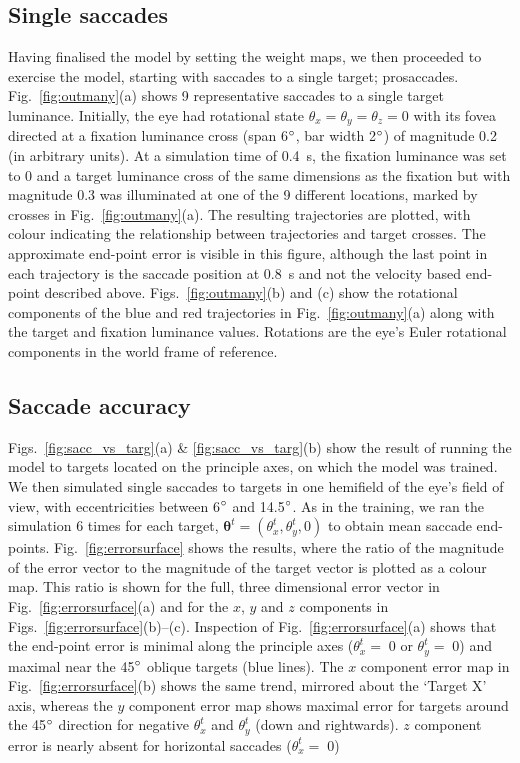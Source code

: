 \documentclass{frontiersSCNS}
\begin{document}
\subsection{Single saccades} \label{sec:singlesaccades}

Having finalised the model by setting the weight maps, we then proceeded 
to exercise the model, starting with saccades to a single target; 
prosaccades. Fig.~\ref{fig:outmany}(a) shows 9 representative saccades
to a single 
target luminance. Initially, the eye had rotational state
$\theta_x=\theta_y=\theta_z=0$ with its fovea directed at a 
fixation luminance cross (span 6$\degree$, bar width 2$\degree$) of 
magnitude 0.2 (in arbitrary units). At a 
simulation time of 0.4~s, the fixation luminance was set to 0 and 
a target luminance cross of the same dimensions as the fixation but with 
magnitude 0.3 was illuminated at one of the 
9 different locations, marked by crosses in Fig.~\ref{fig:outmany}(a).
The resulting trajectories are plotted, with colour indicating the 
relationship between trajectories and target crosses. The approximate 
end-point error is visible in this figure, although the last point in 
each trajectory is the saccade position at 0.8~s and not the velocity
based end-point described above. Figs.~\ref{fig:outmany}(b) and (c)
show the rotational components of the blue and red trajectories
in Fig.~\ref{fig:outmany}(a) along with the target and fixation 
luminance values. Rotations are the eye's Euler rotational components
in the world frame of reference.

\subsection{Saccade accuracy}

Figs.~\ref{fig:sacc_vs_targ}(a) \& \ref{fig:sacc_vs_targ}(b) show
the result of running the model to targets located on the principle
axes, on which the model was trained. We then simulated single saccades
to targets in one hemifield of the eye's field of view, with
eccentricities between 6$\degree$ and 14.5$\degree$. As in the
training, we ran the simulation 6 times for each target, 
$\mathbf{\theta}^t = (\theta_{x}^t, \theta_{y}^t, 0)$ to obtain
mean saccade end-points.
Fig.~\ref{fig:errorsurface} shows the results, where the ratio of 
the magnitude of the error vector to the magnitude of the target 
vector is plotted as a colour map. This ratio is shown for the full,
three dimensional error vector in Fig.~\ref{fig:errorsurface}(a) and
for the $x$, $y$ and $z$ components in Figs.~\ref{fig:errorsurface}(b)--(c).
Inspection of  Fig.~\ref{fig:errorsurface}(a) shows that the end-point 
error is minimal along the principle axes ($\theta_{x}^t=\;$0 or
$\theta_{y}^t=\;$0) and maximal near the 45$\degree$ oblique targets 
(blue lines).
The $x$ component error map in Fig.~\ref{fig:errorsurface}(b) 
shows the same trend, mirrored about the `Target X' axis, whereas
the $y$ component error map shows maximal error for targets around the
45$\degree$ direction for negative $\theta_{x}^t$ and $\theta_{y}^t$ 
(down and rightwards). $z$ component error is nearly absent for 
horizontal saccades ($\theta_{x}^t=\;$0)
\end{document}
